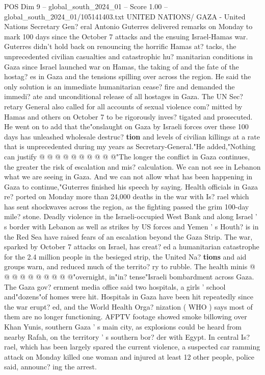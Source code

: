 \begin{textsample}{POS Dim 9 – global\_south\_2024\_01 – Score 1.00 – global\_south\_2024\_01/105141403.txt}  \label{ex:f9_pos_070}
UNITED NATIONS/ GAZA - United Nations Secretary Gen? eral Antonio Guterres delivered remarks on Monday to mark 100 days since the October 7 attacks and the ensuing Israel-Hamas war.
Guterres didn't hold back on renouncing the horrific Hamas at? tacks, the unprecedented civilian casualties and catastrophic hu? manitarian conditions in Gaza since Israel launched war on Hamas, the taking of and the fate of the hostag? es in Gaza and the tensions spilling over across the region.
He said the only solution is an immediate humanitarian cease? fire and demanded the immedi? ate and unconditional release of all hostages in Gaza.
The UN Sec? retary General also called for all accounts of sexual violence com? mitted by Hamas and others on October 7 to be rigorously inves? tigated and prosecuted.
He went on to add that the"onslaught on Gaza by Israeli forces over these 100 days has unleashed wholesale destruc? \textbf{tion} and levels of civilian killings at a rate that is unprecedented during my years as Secretary-General."He added,"Nothing can justify @ @ @ @ @ @ @ @ @ @"The longer the conflict in Gaza continues, the greater the risk of escalation and mis? calculation.
We can not see in Lebanon what we are seeing in Gaza.
And we can not allow what has been happening in Gaza to continue,"Guterres finished his speech by saying.
Health officials in Gaza re? ported on Monday more than 24,000 deaths in the war with Is? rael which has sent shockwaves across the region, as the fighting passed the grim 100-day mile? stone.
Deadly violence in the Israeli-occupied West Bank and along Israel ' s border with Lebanon as well as strikes by US forces and Yemen ' s Houth? is in the Red Sea have raised fears of an escalation beyond the Gaza Strip.
The war, sparked by October 7 attacks on Israel, has creat? ed a humanitarian catastrophe for the 2.4 million people in the besieged strip, the United Na? \textbf{tions} and aid groups warn, and reduced much of the territo? ry to rubble.
The health minis @ @ @ @ @ @ @ @ @ @"overnight, in"in? tense"Israeli bombardment across Gaza.
The Gaza gov? ernment media office said two hospitals, a girls ' school and"dozens"of homes were hit.
Hospitals in Gaza have been hit repeatedly since the war erupt? ed, and the World Health Orga? nization ( WHO ) says most of them are no longer functioning.
AFPTV footage showed smoke billowing over Khan Yunis, southern Gaza ' s main city, as explosions could be heard from nearby Rafah, on the territory ' s southern bor? der with Egypt.
In central Is? rael, which has been largely spared the current violence, a suspected car ramming attack on Monday killed one woman and injured at least 12 other people, police said, announc? ing the arrest.

\end{textsample}
